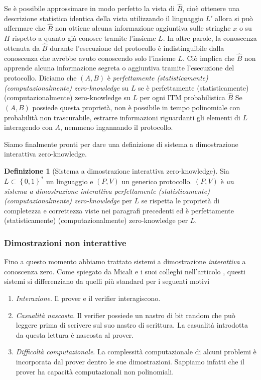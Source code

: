 \documentclass{article}
\theoremstyle{definition}
\newtheorem{definizione}{Definizione}
\begin{document}
Se è possibile approssimare in modo perfetto la vista di $\hat{B}$, cioè ottenere una descrizione statistica identica della vista utilizzando il linguaggio $L'$ allora si può affermare che $\hat{B}$ non ottiene alcuna informazione aggiuntiva sulle stringhe $x$ o su $H$ rispetto a quanto già conosce tramite l'insieme $L$. In altre parole, la conoscenza ottenuta da $\hat{B}$ durante l'esecuzione del protocollo è indistinguibile dalla conoscenza che avrebbe avuto conoscendo solo l'insieme $L$. Ciò implica che $\hat{B}$ non apprende alcuna informazione segreta o aggiuntiva tramite l'esecuzione del protocollo.
Diciamo che $(A,B)$ è \emph{perfettamente (statisticamente) (computazionalmente) zero-knowledge} su $L$ se è perfettamente (statisticamente) (computazionalmente) zero-knowledge su $L$ per ogni ITM probabilistica $\hat{B}$ 
Se $(A,B)$ possiede questa proprietà, non è possibile in tempo polinomiale con probabilità non trascurabile, estrarre informazioni riguardanti gli elementi di $L$ interagendo con $A$, nemmeno ingannando il protocollo.
 
Siamo finalmente pronti per dare una definizione di sistema a dimostrazione interattiva zero-knowledge.

\begin{definizione}[Sistema a dimostrazione interattiva zero-knowledge]
    Sia $L \subset \left\{ 0,1 \right\}^*$ un linguaggio e $(P, V)$ un generico protocollo. $(P, V)$ è \emph{un sistema a dimostrazione interattiva perfettamente (statisticamente) (computazionalmente) zero-knowledge} per $L$ se rispetta le proprietà di completezza e correttezza viste nei paragrafi precedenti ed è perfettamente (statisticamente) (computazionalmente) zero-knowledge per $L$.
\end{definizione}



\subsubsection{Dimostrazioni non interattive}
Fino a questo momento abbiamo trattato sistemi a dimostrazione \emph{interattiva} a conoscenza zero.
Come spiegato da Micali e i suoi colleghi nell'articolo \cite{noninteractive}, questi sistemi si differenziano da quelli più standard per i seguenti motivi 
\begin{enumerate}
    \item \emph{Interazione}. Il prover e il verifier interagiscono.
    \item \emph{Casualità nascosta}. Il verifier possiede un nastro di bit random che può leggere prima di scrivere sul suo nastro di scrittura. La casualità introdotta da questa lettura è nascosta al prover.
    \item \emph{Difficoltà computazionale}. La complessità computazionale di alcuni problemi è incorporata dal prover dentro le sue dimostrazioni. Sappiamo infatti che il prover ha capacità computazionali non polinomiali.
\end{enumerate}
\end{document}
